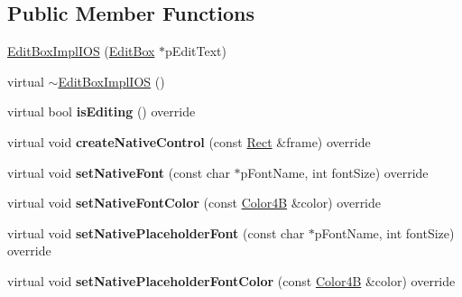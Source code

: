 \subsection*{Public Member Functions}
\begin{DoxyCompactItemize}
\item 
\hyperlink{classui_1_1EditBoxImplIOS_a3beb5f89d2ac3c58a021d744c89bfb01}{Edit\+Box\+Impl\+I\+OS} (\hyperlink{classui_1_1EditBox}{Edit\+Box} $\ast$p\+Edit\+Text)
\item 
virtual \hyperlink{classui_1_1EditBoxImplIOS_a1dffa46a1cd378deed786e7ced11142a}{$\sim$\+Edit\+Box\+Impl\+I\+OS} ()
\item 
\mbox{\label{classui_1_1EditBoxImplIOS_a72bade91bcda5b294cf0c6474becd34d}} 
virtual bool {\bfseries is\+Editing} () override
\item 
\mbox{\label{classui_1_1EditBoxImplIOS_aad960efbfeeae3911a0bdabd2ec148bd}} 
virtual void {\bfseries create\+Native\+Control} (const \hyperlink{classRect}{Rect} \&frame) override
\item 
\mbox{\label{classui_1_1EditBoxImplIOS_a9800d30f035cf2f419888a0d03bf9d36}} 
virtual void {\bfseries set\+Native\+Font} (const char $\ast$p\+Font\+Name, int font\+Size) override
\item 
\mbox{\label{classui_1_1EditBoxImplIOS_aed14a465a6d036d87dbed17c5ad97fe5}} 
virtual void {\bfseries set\+Native\+Font\+Color} (const \hyperlink{structColor4B}{Color4B} \&color) override
\item 
\mbox{\label{classui_1_1EditBoxImplIOS_ac458ca4042c053bb1154c826e67ffd70}} 
virtual void {\bfseries set\+Native\+Placeholder\+Font} (const char $\ast$p\+Font\+Name, int font\+Size) override
\item 
\mbox{\label{classui_1_1EditBoxImplIOS_afcdfd4495993dccab2aed77aef884c0e}} 
virtual void {\bfseries set\+Native\+Placeholder\+Font\+Color} (const \hyperlink{structColor4B}{Color4B} \&color) override
\item 
\mbox{\label{classui_1_1EditBoxImplIOS_a16df4f6f973b34488c972d8160eeaec0}} 

\end{DoxyCompactItemize}
